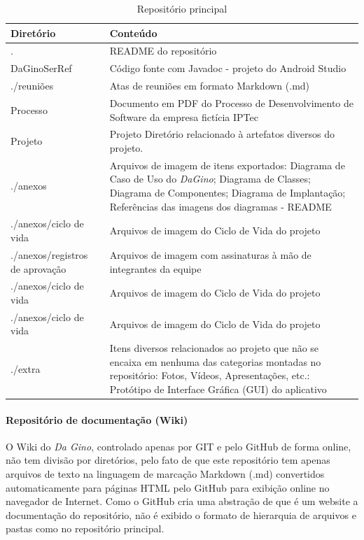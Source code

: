 \begin{table}[H]
      \begin{center}
        \begin{tabular}{| l | p{6cm} |}
        \hline
        \textbf{Diretório} & \textbf{Conteúdo} \\ \hline
        . & README do repositório \\ \hline
        DaGinoSerRef & Código fonte com Javadoc - projeto do Android Studio \\ \hline
        ./reuniões & Atas de reuniões em formato Markdown (.md) \\ \hline
        Processo & Documento em PDF do Processo de Desenvolvimento de Software da empresa fictícia IPTec \\ \hline
        Projeto & Projeto Diretório relacionado à artefatos diversos do projeto. \\ \hline
        ./anexos & Arquivos de imagem de itens exportados: Diagrama de Caso de Uso do \textit{DaGino}; Diagrama de Classes; Diagrama de Componentes; Diagrama de Implantação; Referências das imagens dos diagramas - README \\ \hline
        ./anexos/ciclo de vida & Arquivos de imagem do Ciclo de Vida do projeto \\ \hline
        ./anexos/registros de aprovação & Arquivos de imagem com assinaturas à mão de integrantes da equipe \\ \hline
        ./anexos/ciclo de vida & Arquivos de imagem do Ciclo de Vida do projeto \\ \hline
        ./anexos/ciclo de vida & Arquivos de imagem do Ciclo de Vida do projeto \\ \hline
        ./extra & Itens diversos relacionados ao projeto que não se encaixa em nenhuma das categorias montadas no repositório: Fotos, Vídeos, Apresentações, etc.: Protótipo de Interface Gráfica (GUI) do aplicativo \\ \hline
        \end{tabular}
      \end{center}
    \caption{Repositório principal}
    \end{table}

\paragraph{Repositório de documentação (Wiki)}

O Wiki do \textit{Da Gino}, controlado apenas por GIT e pelo GitHub de forma online, não tem divisão por diretórios, pelo fato de que este repositório tem apenas arquivos de texto na linguagem de marcação Markdown (.md) convertidos automaticamente para páginas HTML pelo GitHub para exibição online no navegador de Internet. Como o GitHub cria uma abstração de que é um website a documentação do repositório, não é exibido o formato de hierarquia de arquivos e pastas como no repositório principal.

